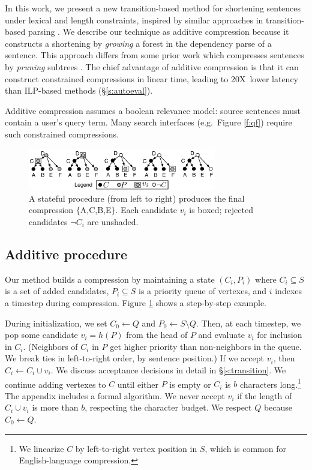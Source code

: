 \documentclass[11pt,a4paper]{article}
\newcommand{\speedup}[0]{20X~}
\begin{document}
In this work, we present a new transition-based method for shortening sentences under lexical and length constraints, inspired by similar approaches in transition-based parsing \cite{nivre2003}. We describe our technique as additive compression because it constructs a shortening by \textit{growing} a forest in the dependency parse of a sentence. This approach differs from some prior work which
compresses sentences by \textit{pruning} subtrees \cite{Knight2000StatisticsBasedS,berg2011jointly,almeida2013fast,Filippova2015FastKS}. The chief advantage of additive compression is that it can construct constrained compressions in linear time, leading to \speedup lower latency than ILP-based methods (\S\ref{s:autoeval}). 

Additive compression assumes a boolean relevance model: source sentences must contain a user's query term. Many search interfaces (e.g.\ Figure \ref{f:qf}) require such constrained compressions.


\begin{figure}[h]
\includegraphics[width=8.2cm]{additive.pdf}
\caption{A stateful procedure (from left to right) produces the final compression $\{$A,C,B,E$\}$. Each candidate $v_i$ is boxed; rejected candidates $\neg C_i$ are unshaded.}
\label{f:walkthru}
\end{figure}

\subsection{Additive procedure}\label{s:formal}

Our method builds a compression by maintaining a state
$(C_i,P_i)$ where $C_i \subseteq S$ is a set of added candidates, $P_i  \subseteq S$ is a priority queue of vertexes, and $i$ indexes a timestep during compression. Figure \ref{f:walkthru} shows a step-by-step example. 

During initialization, we set $C_0 \gets Q$ and $P_0 \gets S \setminus Q$. Then, at each timestep, we pop some candidate $v_i =h(P)$ from the head of $P$ and evaluate $v_i$ for inclusion in $C_i$. (Neighbors of $C_i$ in $P$ get higher priority than non-neighbors in the queue. We break ties in left-to-right order, by sentence position.) If we accept $v_i$, then $C_i \gets C_i \cup v_i$. We discuss acceptance decisions in detail in \S\ref{s:transition}. We continue adding vertexes to $C$ until either $P$ is empty or $C_i$ is $b$ characters long.\footnote{We linearize $C$ by left-to-right vertex position in $S$, which is common for English-language compression.} The appendix includes a formal algorithm. We never accept $v_i$ if the length of $C_i \cup v_i$ is more than $b$, respecting the character budget. We respect $Q$ because $C_0 \gets Q$. 
\end{document}
